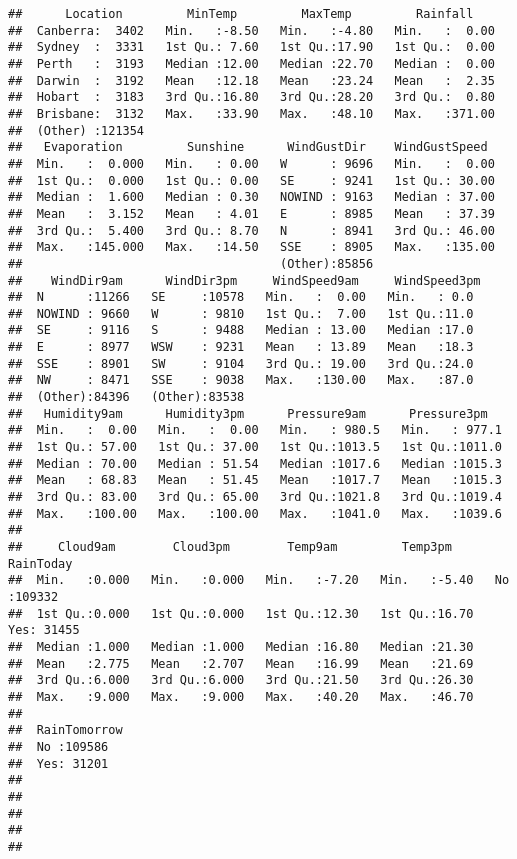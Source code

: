 \documentclass[
]{article}
\begin{document}
\begin{verbatim}
##      Location         MinTemp         MaxTemp         Rainfall     
##  Canberra:  3402   Min.   :-8.50   Min.   :-4.80   Min.   :  0.00  
##  Sydney  :  3331   1st Qu.: 7.60   1st Qu.:17.90   1st Qu.:  0.00  
##  Perth   :  3193   Median :12.00   Median :22.70   Median :  0.00  
##  Darwin  :  3192   Mean   :12.18   Mean   :23.24   Mean   :  2.35  
##  Hobart  :  3183   3rd Qu.:16.80   3rd Qu.:28.20   3rd Qu.:  0.80  
##  Brisbane:  3132   Max.   :33.90   Max.   :48.10   Max.   :371.00  
##  (Other) :121354                                                   
##   Evaporation         Sunshine      WindGustDir    WindGustSpeed   
##  Min.   :  0.000   Min.   : 0.00   W      : 9696   Min.   :  0.00  
##  1st Qu.:  0.000   1st Qu.: 0.00   SE     : 9241   1st Qu.: 30.00  
##  Median :  1.600   Median : 0.30   NOWIND : 9163   Median : 37.00  
##  Mean   :  3.152   Mean   : 4.01   E      : 8985   Mean   : 37.39  
##  3rd Qu.:  5.400   3rd Qu.: 8.70   N      : 8941   3rd Qu.: 46.00  
##  Max.   :145.000   Max.   :14.50   SSE    : 8905   Max.   :135.00  
##                                    (Other):85856                   
##    WindDir9am      WindDir3pm     WindSpeed9am     WindSpeed3pm 
##  N      :11266   SE     :10578   Min.   :  0.00   Min.   : 0.0  
##  NOWIND : 9660   W      : 9810   1st Qu.:  7.00   1st Qu.:11.0  
##  SE     : 9116   S      : 9488   Median : 13.00   Median :17.0  
##  E      : 8977   WSW    : 9231   Mean   : 13.89   Mean   :18.3  
##  SSE    : 8901   SW     : 9104   3rd Qu.: 19.00   3rd Qu.:24.0  
##  NW     : 8471   SSE    : 9038   Max.   :130.00   Max.   :87.0  
##  (Other):84396   (Other):83538                                  
##   Humidity9am      Humidity3pm      Pressure9am      Pressure3pm    
##  Min.   :  0.00   Min.   :  0.00   Min.   : 980.5   Min.   : 977.1  
##  1st Qu.: 57.00   1st Qu.: 37.00   1st Qu.:1013.5   1st Qu.:1011.0  
##  Median : 70.00   Median : 51.54   Median :1017.6   Median :1015.3  
##  Mean   : 68.83   Mean   : 51.45   Mean   :1017.7   Mean   :1015.3  
##  3rd Qu.: 83.00   3rd Qu.: 65.00   3rd Qu.:1021.8   3rd Qu.:1019.4  
##  Max.   :100.00   Max.   :100.00   Max.   :1041.0   Max.   :1039.6  
##                                                                     
##     Cloud9am        Cloud3pm        Temp9am         Temp3pm      RainToday   
##  Min.   :0.000   Min.   :0.000   Min.   :-7.20   Min.   :-5.40   No :109332  
##  1st Qu.:0.000   1st Qu.:0.000   1st Qu.:12.30   1st Qu.:16.70   Yes: 31455  
##  Median :1.000   Median :1.000   Median :16.80   Median :21.30               
##  Mean   :2.775   Mean   :2.707   Mean   :16.99   Mean   :21.69               
##  3rd Qu.:6.000   3rd Qu.:6.000   3rd Qu.:21.50   3rd Qu.:26.30               
##  Max.   :9.000   Max.   :9.000   Max.   :40.20   Max.   :46.70               
##                                                                              
##  RainTomorrow
##  No :109586  
##  Yes: 31201  
##              
##              
##              
##              
## 
\end{verbatim}
\end{document}
